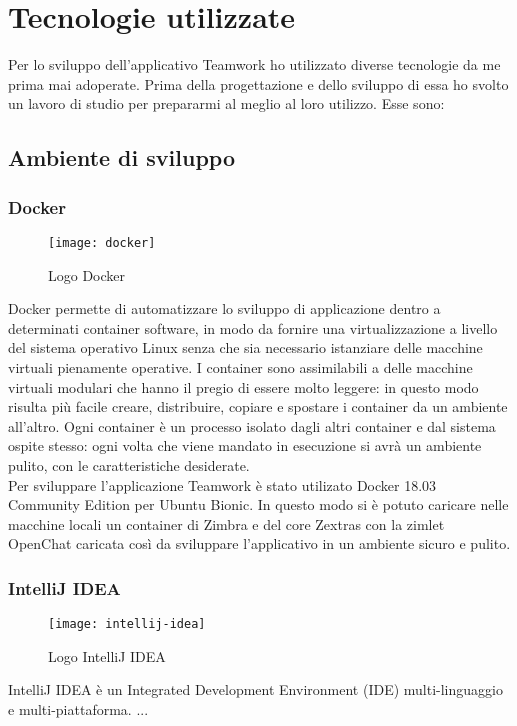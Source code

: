 
\chapter{Tecnologie utilizzate}\label{chap:tec}
Per lo sviluppo dell'applicativo Teamwork ho utilizzato diverse tecnologie da me prima mai adoperate. Prima della progettazione e dello sviluppo di essa ho svolto un lavoro di studio per prepararmi al meglio al loro utilizzo. Esse sono:

\section{Ambiente di sviluppo}
\subsection{Docker}
\begin{figure}[H] 
	\centering
	\texttt{[image: docker]}
	\caption{Logo Docker}
\end{figure}
Docker permette di automatizzare lo sviluppo di applicazione dentro a determinati container software, in modo da fornire una virtualizzazione a livello del sistema operativo Linux senza che sia necessario istanziare delle macchine virtuali pienamente operative.
I container sono assimilabili a delle macchine virtuali modulari che hanno il pregio di essere molto leggere: in questo modo risulta più facile  creare, distribuire, copiare e spostare i container da un ambiente all'altro.
Ogni container è un processo isolato dagli altri container e dal sistema ospite stesso:  ogni volta che viene mandato in esecuzione si avrà un ambiente pulito, con le caratteristiche desiderate. \\
Per sviluppare l'applicazione Teamwork è stato utilizato Docker 18.03 Community Edition per Ubuntu Bionic. In questo modo si è potuto caricare nelle macchine locali un container di Zimbra e del core Zextras con la zimlet OpenChat caricata così da sviluppare l'applicativo in un ambiente sicuro e pulito.

\subsection{IntelliJ IDEA}
\begin{figure}[H] 
	\centering
	\texttt{[image: intellij-idea]}
	\caption{Logo IntelliJ IDEA}
\end{figure}
IntelliJ IDEA è un Integrated Development Environment (IDE) multi-linguaggio
e multi-piattaforma. ...

